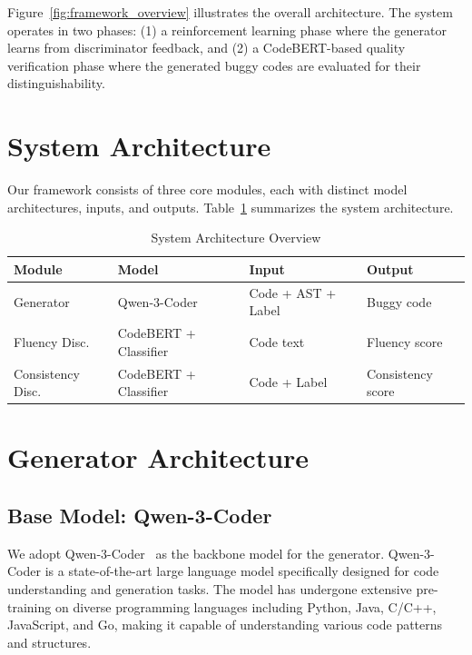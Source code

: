 Figure~\ref{fig:framework_overview} illustrates the overall architecture. The system operates in two phases: (1) a reinforcement learning phase where the generator learns from discriminator feedback, and (2) a CodeBERT-based quality verification phase where the generated buggy codes are evaluated for their distinguishability.

\section{System Architecture}

Our framework consists of three core modules, each with distinct model architectures, inputs, and outputs. Table~\ref{tab:system_architecture} summarizes the system architecture.

\begin{table}[h]
\centering
\caption{System Architecture Overview}
\label{tab:system_architecture}
\begin{tabular}{p{2.2cm} p{3.2cm} p{3.5cm} p{2.5cm}}
\toprule
\textbf{Module} & \textbf{Model} & \textbf{Input} & \textbf{Output} \\
\midrule
Generator & Qwen-3-Coder & Code + AST + Label & Buggy code \\
Fluency Disc. & CodeBERT + Classifier & Code text & Fluency score \\
Consistency Disc. & CodeBERT + Classifier & Code + Label & Consistency score \\
\bottomrule
\end{tabular}
\end{table}

\section{Generator Architecture}

\subsection{Base Model: Qwen-3-Coder}

We adopt Qwen-3-Coder~\cite{cao2026qwen3codernexttechnicalreport} as the backbone model for the generator. Qwen-3-Coder is a state-of-the-art large language model specifically designed for code understanding and generation tasks. The model has undergone extensive pre-training on diverse programming languages including Python, Java, C/C++, JavaScript, and Go, making it capable of understanding various code patterns and structures.

